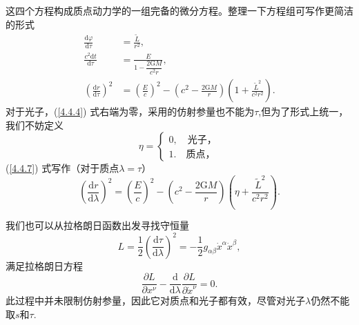\documentclass[11pt, a4paper, oneside, onecolumn]{ctexart}
\numberwithin{equation}{subsection}
\begin{document}
\newpage
这四个方程构成质点动力学的一组完备的微分方程。整理一下方程组可写作更简洁的形式
\begin{align}
\frac{\mathrm{d}\varphi}{\mathrm{d}\tau}&=\frac{\widetilde{L}}{r^{2}},\\
\frac{c^{2}\mathrm{d}t}{\mathrm{d}\tau}&=\frac{E}{1-\dfrac{2\mathrm{G}M}{c^{2}r}},\\
\left(\frac{\mathrm{d}r}{\mathrm{d}\tau}\right)^{2}&=\left(\frac{E}{c}\right)^{2}-\left(c^{2}-\frac{2\mathrm{G}M}{r}\right)\left(1+\frac{\widetilde{L}^{2}}{c^{2}r^{2}}\right).\label{4.4.7}
\end{align}
对于光子，(\ref{4.4.4}) 式右端为零，采用的仿射参量也不能为$\tau$,但为了形式上统一，我们不妨定义
\begin{equation}
\eta=
\begin{cases}
0,\quad\text{光子，}\\
1.\quad\text{质点，}
\end{cases}
\end{equation}
(\ref{4.4.7}) 式写作（对于质点$\lambda=\tau$）
\begin{equation}
\left(\frac{\mathrm{d}r}{\mathrm{d}\lambda}\right)^{2}=\left(\frac{E}{c}\right)^{2}-\left(c^{2}-\frac{2\mathrm{G}M}{r}\right)\left(\eta+\frac{\widetilde{L}^{2}}{c^{2}r^{2}}\right).
\end{equation}

我们也可以从拉格朗日函数出发寻找守恒量
\begin{equation}
L=\frac12\left(\frac{\mathrm{d}\tau}{\mathrm{d}\lambda}\right)^{2}=-\frac12g_{\alpha\beta}\dot{x}^{\alpha}\dot{x}^{\beta},
\end{equation}
满足拉格朗日方程
\begin{equation}
\frac{\partial{}L}{\partial{}x^{\nu}}-\frac{\mathrm{d}}{\mathrm{d}\lambda}\frac{\partial{}L}{\partial{}\dot{x}^{\nu}}=0.
\end{equation}
此过程中并未限制仿射参量，因此它对质点和光子都有效，尽管对光子$\lambda$仍然不能取$s$和$\tau$.
\end{document}
